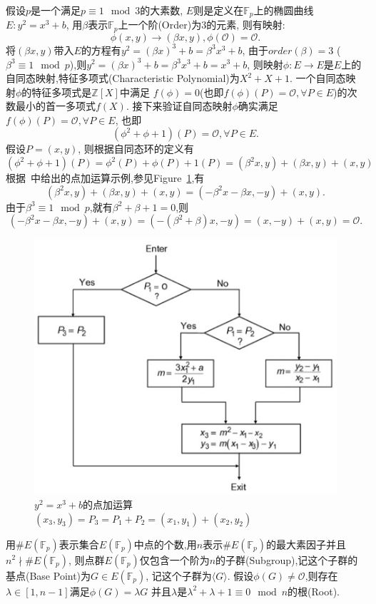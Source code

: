 \documentclass{article}
\newcommand{\Z}{\mathbb{Z}}
\newcommand{\F}{\mathbb{F}}
\begin{document}
假设$p$是一个满足$p\equiv 1 \mod 3$的大素数, $E$则是定义在$\F_p$上的椭圆曲线$E: y^2 = x^3 + b$,
用$\beta$表示$\F_p$上一个阶(Order)为3的元素, 则有映射:
$$\phi(x,y) \rightarrow (\beta x, y), \phi(\mathcal{O}) = \mathcal{O}.$$
将$(\beta x, y)$带入$E$的方程有$y^2 = (\beta x)^3 + b = \beta^3x^3 + b$,
由于$order(\beta)=3$ ($\beta^3 \equiv 1 \mod p$),则$y^2 = (\beta x)^3 + b = \beta^3x^3 + b  = x^3 + b$,
则映射$\phi: E \rightarrow E$是$E$上的自同态映射,特征多项式(Characteristic Polynomial)为$X^2 + X + 1$.
一个自同态映射$\phi$的特征多项式是$\Z[X]$中满足
$f(\phi)=0$(也即$f(\phi)(P)=\mathcal{O}, \forall P\in E$)的次数最小的首一多项式$f(X)$.
接下来验证自同态映射$\phi$确实满足$f(\phi)(P)=\mathcal{O}, \forall P\in E$, 也即
$$(\phi^2+\phi+1)(P) = \mathcal{O}, \forall P \in E.$$
假设$P=(x,y)$, 则根据自同态环的定义有
$$(\phi^2+\phi+1)(P) = \phi^2(P) + \phi(P) +1(P) = (\beta^2 x, y) + (\beta x, y) + (x,y)$$
根据~\cite{Blahut14}中给出的点加运算示例,参见Figure~\ref{fig-ecpoint-add},有
 $$(\beta^2 x, y) + (\beta x, y) + (x,y) = (-\beta^2 x -\beta x, -y) + (x,y).$$
 由于$\beta^3 \equiv 1 \mod p$,就有$\beta^2+\beta+1=0$,则
$$ (-\beta^2 x -\beta x, -y) + (x,y) = (-(\beta^2+\beta) x, -y) = (x,-y) + (x,y) = \mathcal{O}.$$
 
\begin{figure}
\centering
\includegraphics[width=.7\textwidth]{ec-point-addition.png}
\caption{$y^2=x^3+b$的点加运算$(x_3,y_3)=P_3=P_1+P_2=(x_1,y_1) + (x_2,y_2)$}\label{fig-ecpoint-add}
\end{figure}

用$\#E(\F_p)$表示集合$E(\F_p)$中点的个数,用$n$表示$\#E(\F_p)$的最大素因子并且$n^2 \nmid \#E(\F_p)$,
则点群$E(\F_p)$仅包含一个阶为$n$的子群(Subgroup),记这个子群的基点(Base Point)为$G\in E(\F_p)$, 
记这个子群为$\langle G \rangle$. 
假设$\phi(G)\neq \mathcal{O}$,则存在$\lambda\in [1, n-1]$满足$\phi(G) = \lambda G$
并且$\lambda$是$\lambda^2+\lambda+1\equiv 0 \mod n$的根(Root).
\end{document}
